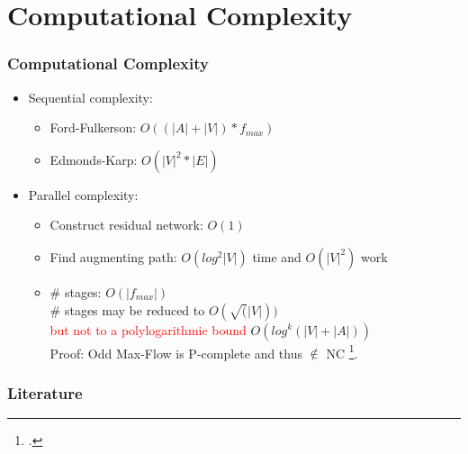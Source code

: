 \documentclass{beamer}
\begin{document}
\section{Computational Complexity}
\begin{frame}
	\frametitle{Computational Complexity}
	\begin{itemize}
		\item Sequential complexity:
		\begin{itemize}
			\item Ford-Fulkerson: $O((|A|+|V|)*f_{max})$
			\item Edmonds-Karp: $O(|V|^{2} * |E|) $
		\end{itemize}
		\pause
		\item Parallel complexity:
		\begin{itemize}
			\item Construct residual network: $O(1)$
			\item Find augmenting path: $O(log^{2}|V|)$ time and $O(|V|^{2})$ work
			\item \# stages: $O(|f_{max}|)$\\
				\# stages may be reduced to $O(\sqrt(|V|))$\\
			  	\textcolor{red}{but not to a polylogarithmic bound} $O(log^{k}(|V| + |A|))$\\
			  	Proof: Odd Max-Flow is P-complete and  thus $\notin$ NC
			  	\footcite{papa95}.
		\end{itemize}			
	\end{itemize}
\end{frame}
 	 
\begin{frame}[allowframebreaks]
\frametitle<presentation>{Literature}    
\printbibliography
\end{frame} 	 
 	 
\end{document}

